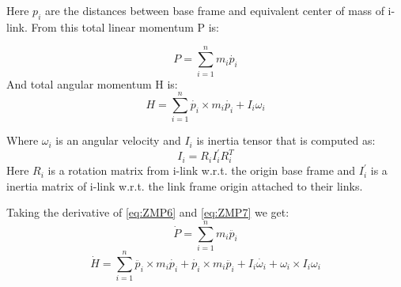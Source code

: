 \documentclass[12pt,a4paper]{report}
\begin{document}
		Here $p_i$ are the distances between base frame and equivalent center of mass of i-link. From this total linear momentum P is:
	
		\begin{equation} \label{eq:ZMP6}
			P = \sum^n_{i=1}{m_i \dot{p_i}}
		\end{equation}
		And total angular momentum H is:
		\begin{equation} \label{eq:ZMP7}
			H = \sum^n_{i=1}{\dot{p_i} \times m_i \dot{p_i} + I_i \omega_i}
		\end{equation}

		Where $\omega_i$ is an angular velocity and $I_i$ is inertia tensor that is computed as:
		\begin{equation} \label{eq:ZMP8}
			I_i = R_i I_i^{\prime} R_i^T
		\end{equation}
		Here $R_i$ is a rotation matrix from i-link w.r.t. the origin base frame and $I_i^{\prime}$ is a inertia matrix of i-link w.r.t. the link frame origin attached to their links.

		Taking the derivative of \ref{eq:ZMP6} and \ref{eq:ZMP7} we get:
		\begin{equation} \label{eq:ZMP9}
			\dot{P} = \sum^n_{i=1}{m_i \ddot{p_i}}
		\end{equation}
		\begin{equation} \label{eq:ZMP10}
			\dot{H} = \sum^n_{i=1}{\ddot{p_i} \times m_i \dot{p_i} + \dot{p_i} \times m_i \ddot{p_i} + I_i \dot{\omega_i}} + \omega_i \times I_i \omega_i
		\end{equation}
\end{document}
